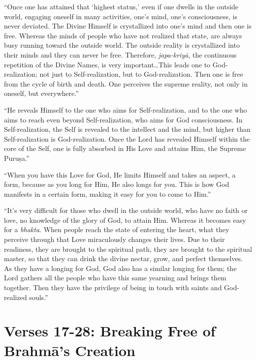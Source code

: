 \enquote{Once one has attained that \enquote{highest status,} even if one dwells in the outside world, engaging oneself in many activities, one’s mind, one’s consciousness, is never deviated. The Divine Himself is crystallized into one’s mind and then one is free. Whereas the minds of people who have not realized that state, are always busy running toward the outside world. The outside reality is crystallized into their minds and they can never be free. Therefore, \textit{japa-kriyā}, the continuous repetition of the Divine Names, is very important\ldots This leads one to God-realization; not just to Self-realization, but to God-realization. Then one is free from the cycle of birth and death. One perceives the supreme reality, not only in oneself, but everywhere.}

\enquote{He reveals Himself to the one who aims for Self-realization, and to the one who aims to reach even beyond Self-realization, who aims for God consciousness. In Self-realization, the Self is revealed to the intellect and the mind, but higher than Self-realization is God-realization. Once the Lord has revealed Himself within the core of the Self, one is fully absorbed in His Love and attains Him, the Supreme Puruṣa.}

\enquote{When you have this Love for God, He limits Himself and takes an aspect, a form, because as you long for Him, He also longs for you. This is how God manifests in a certain form, making it easy for you to come to Him.}

\enquote{It’s very difficult for those who dwell in the outside world, who have no faith or love, no knowledge of the glory of God, to attain Him. Whereas it becomes easy for a \textit{bhakta}. When people reach the state of entering the heart, what they perceive through that Love miraculously changes their lives. Due to their readiness, they are brought to the spiritual path, they are brought to the spiritual master, so that they can drink the divine nectar, grow, and perfect themselves. As they have a longing for God, God also has a similar longing for them; the Lord gathers all the people who have this same yearning and brings them together. Then they have the privilege of being in touch with saints and God-realized souls.}

\section{Verses 17-28: Breaking Free of Brahmā's Creation}\label{sec-verses-17-28-breaking-free-of-brahma-s-creation}

